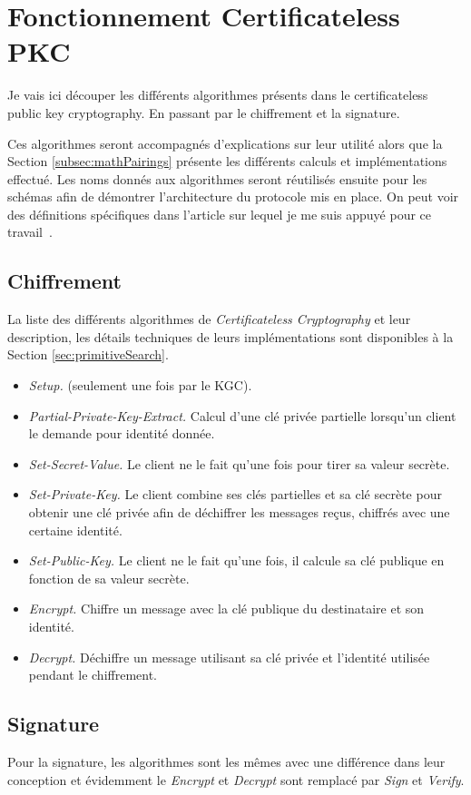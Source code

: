 \section{Fonctionnement Certificateless PKC}
Je vais ici découper les différents algorithmes présents dans le certificateless public key cryptography. En passant par le chiffrement et la signature.

Ces algorithmes seront accompagnés d'explications sur leur utilité alors que la Section \ref{subsec:mathPairings} présente les différents calculs et implémentations effectué. Les noms donnés aux algorithmes seront réutilisés ensuite pour les schémas afin de démontrer l'architecture du protocole mis en place. On peut voir des définitions spécifiques dans l'article sur lequel je me suis appuyé pour ce travail~\cite{conf/pkc/DentLP08}.
\subsection{Chiffrement}
La liste des différents algorithmes de \textit{Certificateless Cryptography} et leur description, les détails techniques de leurs implémentations sont disponibles à la Section \ref{sec:primitiveSearch}.
\begin{itemize}
	\item \textit{Setup.} (seulement une fois par le KGC).
	\item \textit{Partial-Private-Key-Extract.} Calcul d'une clé privée partielle lorsqu'un client le demande pour identité donnée.
	\item \textit{Set-Secret-Value.} Le client ne le fait qu'une fois pour tirer sa valeur secrète.
	\item \textit{Set-Private-Key.} Le client combine ses clés partielles et sa clé secrète pour obtenir une clé privée afin de déchiffrer les messages reçus, chiffrés avec une certaine identité.
	\item \textit{Set-Public-Key.} Le client ne le fait qu'une fois, il calcule sa clé publique en fonction de sa valeur secrète.
	\item \textit{Encrypt.} Chiffre un message avec la clé publique du destinataire et son identité.
	\item \textit{Decrypt.} Déchiffre un message utilisant sa clé privée et l'identité utilisée pendant le chiffrement.
\end{itemize}
\subsection{Signature}
Pour la signature, les algorithmes sont les mêmes avec une différence dans leur conception et évidemment le \textit{Encrypt} et \textit{Decrypt} sont remplacé par \textit{Sign} et \textit{Verify}.

